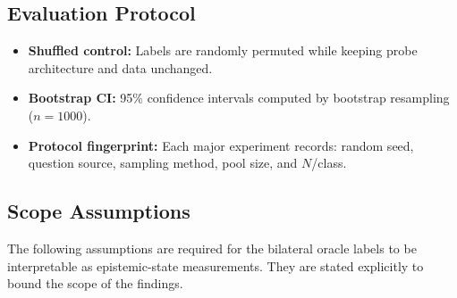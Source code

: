 \documentclass[11pt]{article}
\begin{document}
\subsection{Evaluation Protocol}

\begin{itemize}[leftmargin=2em]
\item \textbf{Shuffled control:} Labels are randomly permuted while keeping probe
  architecture and data unchanged.
\item \textbf{Bootstrap CI:} 95\% confidence intervals computed by bootstrap
  resampling ($n=1000$).
\item \textbf{Protocol fingerprint:} Each major experiment records: random seed,
  question source, sampling method, pool size, and $N$/class.
\end{itemize}

\subsection{Scope Assumptions}
\label{sec:assumptions}

The following assumptions are required for the bilateral oracle labels to be
interpretable as epistemic-state measurements. They are stated explicitly to
bound the scope of the findings.
\end{document}

